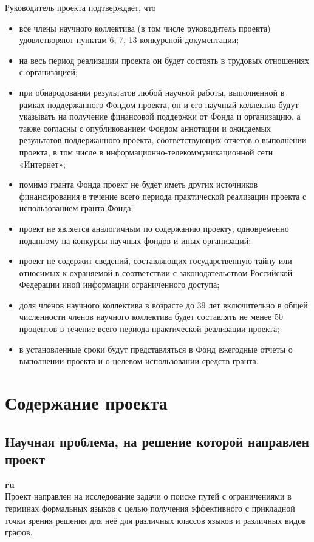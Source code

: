 \documentclass[12pt]{article}  %
\theoremstyle{remark}
\begin{document}
\vline
Руководитель проекта подтверждает, что
\begin{itemize}
\item все члены научного коллектива (в том числе руководитель проекта) удовлетворяют пунктам 6, 7, 13 конкурсной документации;
\item на весь период реализации проекта он будет состоять в трудовых отношениях с организацией;
\item при обнародовании результатов любой научной работы, выполненной в рамках поддержанного Фондом проекта, он и его научный коллектив будут указывать на получение финансовой поддержки от Фонда и организацию, а также согласны с опубликованием Фондом аннотации и ожидаемых результатов поддержанного проекта, соответствующих отчетов о выполнении проекта, в том числе в информационно-телекоммуникационной сети «Интернет»;
\item помимо гранта Фонда проект не будет иметь других источников финансирования в течение всего периода практической реализации проекта с использованием гранта Фонда;
\item проект не является аналогичным по содержанию проекту, одновременно поданному на конкурсы научных фондов и иных организаций;
\item проект не содержит сведений, составляющих государственную тайну или относимых к охраняемой в соответствии с законодательством Российской Федерации иной информации ограниченного доступа;
\item доля членов научного коллектива в возрасте до 39 лет включительно в общей численности членов научного коллектива будет составлять не менее 50 процентов в течение всего периода практической реализации проекта;
\item в установленные сроки будут представляться в Фонд ежегодные отчеты о выполнении проекта и о целевом использовании средств гранта.
\end{itemize}

\section{Содержание проекта}

\subsection{Научная проблема, на решение которой направлен проект}

\textbf{ru}\\
%
Проект направлен на исследование задачи о поиске путей с ограничениями в терминах формальных языков с целью получения эффективного с прикладной точки зрения решения для неё для различных классов языков и различных видов графов.
\end{document}
